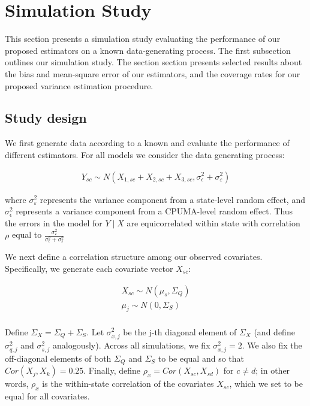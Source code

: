 \section{Simulation Study}\label{app:simstudy}

This section presents a simulation study evaluating the performance of our proposed estimators on a known data-generating process. The first subsection outlines our simulation study. The section section presents selected results about the bias and mean-square error of our estimators, and the coverage rates for our proposed variance estimation procedure.

\subsection{Study design}

We first generate data according to a known and evaluate the performance of different estimators. For all models we consider the data generating process:

\begin{align*}
Y_{sc} \sim N(X_{1, sc} + X_{2, sc} + X_{3, sc}, \sigma^2_{\epsilon} + \sigma^2_{\varepsilon})
\end{align*}

where $\sigma^2_{\varepsilon}$ represents the variance component from a state-level random effect, and $\sigma^2_{\epsilon}$ represents a variance component from a CPUMA-level random effect. Thus the errors in the model for $Y \mid X$ are equicorrelated within state with correlation $\rho$ equal to $\frac{\sigma^2_{\varepsilon}}{\sigma^2_{\epsilon} + \sigma^2_{\varepsilon}}$

We next define a correlation structure among our observed covariates. Specifically, we generate each covariate vector $X_{sc}$:

\begin{align*}
X_{sc} \sim N(\mu_s, \Sigma_{Q}) \\
\mu_j \sim N(0, \Sigma_{S}) \\
\end{align*}

Define $\Sigma_X = \Sigma_Q + \Sigma_S$. Let $\sigma^2_{x, j}$ be the j-th diagonal element of $\Sigma_X$ (and define $\sigma^2_{q, j}$ and $\sigma^2_{s, j}$ analogously). Across all simulations, we fix $\sigma^2_{x, j} = 2$. We also fix the off-diagonal elements of both $\Sigma_Q$ and $\Sigma_S$ to be equal and so that $Cor(X_j, X_k) = 0.25$. Finally, define $\rho_x = Cor(X_{sc}, X_{sd})$ for $c \ne d$; in other words, $\rho_x$ is the within-state correlation of the covariates $X_{sc}$, which we set to be equal for all covariates.

